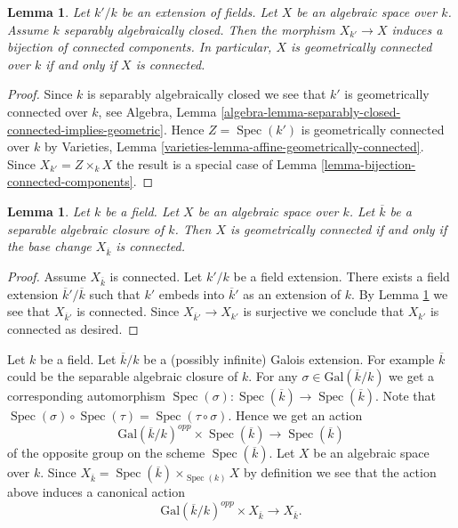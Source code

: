 \documentclass{stacks-project}
\theoremstyle{plain}
\newtheorem{lemma}[subsection]{Lemma}
\theoremstyle{definition}
\theoremstyle{remark}
\numberwithin{equation}{subsection}
\def\Spec{\mathop{\mathrm{Spec}}}
\begin{document}
\begin{lemma}
\label{lemma-separably-closed-field-connected-components}
Let $k'/k$ be an extension of fields. Let $X$ be an algebraic space
over $k$. Assume $k$ separably algebraically closed. Then the morphism
$X_{k'} \to X$ induces a bijection of connected components. In particular,
$X$ is geometrically connected over $k$ if and only if $X$ is connected.
\end{lemma}

\begin{proof}
Since $k$ is separably algebraically closed we see that
$k'$ is geometrically connected over $k$, see
Algebra,
Lemma \ref{algebra-lemma-separably-closed-connected-implies-geometric}.
Hence $Z = \Spec(k')$ is geometrically connected over $k$ by
Varieties, Lemma \ref{varieties-lemma-affine-geometrically-connected}.
Since $X_{k'} = Z \times_k X$ the result is a special case of
Lemma \ref{lemma-bijection-connected-components}.
\end{proof}

\begin{lemma}
\label{lemma-characterize-geometrically-connected}
Let $k$ be a field. Let $X$ be an algebraic space over $k$.
Let $\overline{k}$ be a separable algebraic closure of $k$.
Then $X$ is geometrically connected if and only if the base change
$X_{\overline{k}}$ is connected.
\end{lemma}

\begin{proof}
Assume $X_{\overline{k}}$ is connected. Let $k'/k$ be a field
extension. There exists a field extension $\overline{k}'/\overline{k}$
such that $k'$ embeds into $\overline{k}'$ as an extension of $k$.
By Lemma \ref{lemma-separably-closed-field-connected-components}
we see that $X_{\overline{k}'}$ is connected.
Since $X_{\overline{k}'} \to X_{k'}$ is surjective we conclude
that $X_{k'}$ is connected as desired.
\end{proof}

\noindent
Let $k$ be a field. Let $\overline{k}/k$ be a (possibly infinite)
Galois extension. For example $\overline{k}$ could be the
separable algebraic closure of $k$.
For any $\sigma \in \text{Gal}(\overline{k}/k)$ we get a corresponding
automorphism
$
\Spec(\sigma) :
\Spec(\overline{k})
\longrightarrow
\Spec(\overline{k})
$.
Note that
$\Spec(\sigma) \circ \Spec(\tau) = \Spec(\tau \circ \sigma)$.
Hence we get an action
$$
\text{Gal}(\overline{k}/k)^{opp} \times \Spec(\overline{k})
\longrightarrow
\Spec(\overline{k})
$$
of the opposite group on the scheme $\Spec(\overline{k})$.
Let $X$ be an algebraic space over $k$. Since
$X_{\overline{k}} =
\Spec(\overline{k}) \times_{\Spec(k)} X$
by definition we see that the action above induces a canonical action
\begin{equation}
\label{equation-galois-action-base-change-kbar}
\text{Gal}(\overline{k}/k)^{opp} \times X_{\overline{k}}
\longrightarrow
X_{\overline{k}}.
\end{equation}
\end{document}
